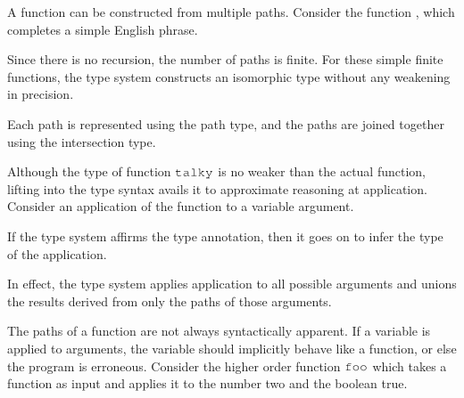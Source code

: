 \documentclass[acmsmall]{acmart}
\theoremstyle{definition}
\begin{document}
A function can be constructed from multiple paths. 
Consider the function , which completes a simple English phrase.


\noindent
Since there is no recursion, the number of paths is finite.
For these simple finite functions, the type system constructs
an isomorphic type without any weakening in precision. 


\noindent
Each path is represented using the path type,
and the paths are joined together using the intersection type.

Although the type of function $\J{talky}$ is no weaker than the actual function,
lifting into the type syntax avails it to approximate reasoning at application.
Consider an application of the function to a variable argument. 


\noindent
If the type system affirms the type annotation,
then it goes on to infer the type of the application. 


\noindent
In effect, the type system applies application to all possible arguments
and unions the results derived from only the paths of those arguments. 

The paths of a function are not always syntactically apparent. 
If a variable is applied to arguments, the variable should implicitly behave 
like a function, or else the program is erroneous. 
Consider the higher order function $\J{foo}$ which takes a function as input
and applies it to the number two and the boolean true.

\end{document}
